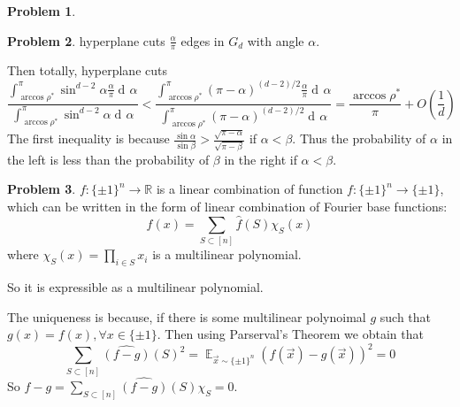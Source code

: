 \documentclass[a4paper]{article}
\theoremstyle{definition}
\newtheorem{problem}{Problem}
\theoremstyle{plain}
\newcommand{\Rbb}{\mathbb R}
\newcommand{\Ebb}{\mathop\mathbb E}
\newcommand{\dps}{\displaystyle}
\newcommand{\<}{\left<}
\renewcommand{\>}{\right>}
\numberwithin{equation}{problem}
\DeclareMathOperator{\dd}{d\!}
\newcommand{\ie}{ \textit{ i.e. } }
\begin{document}
\begin{problem}
  
  
\end{problem}
\begin{problem}
  hyperplane cuts  $ \frac{\alpha}{\pi} $ edges in  $ G_d $ with angle  $ \alpha $.
  
  Then totally, hyperplane cuts 
  \[\frac{\int_{\arccos\rho^*}^\pi \sin^{d-2}\alpha\frac{\alpha}{\pi}\dd \alpha}{\int_{\arccos\rho^*}^\pi\sin^{d-2}\alpha\dd \alpha}<\frac{\int_{\arccos\rho^*}^\pi(\pi-\alpha)^{(d-2)/2}\frac{\alpha}{\pi}\dd\alpha}{\int_{\arccos\rho^*}^\pi(\pi-\alpha)^{(d-2)/2}\dd \alpha}=\frac{\arccos\rho^*}{\pi}+O(\frac{1}{d})\]
  The first inequality is because  $ \dps\frac{\sin \alpha}{\sin \beta}>\frac{\sqrt{\pi-\alpha}}{\sqrt{\pi-\beta}} $ if  $ \alpha<\beta $. Thus the probability of  $ \alpha $ in the left is less than the probability of  $ \beta $ in the right if  $ \alpha<\beta $.

\end{problem}
\begin{problem}
  $ f:\{\pm 1\}^n\rightarrow \Rbb $ is a linear combination of function  $ f:\{\pm 1\}^n\rightarrow \{\pm 1\} $, which can be written in the form of linear combination of Fourier base functions:
  \[f(x)=\sum_{S\subset [n]}\hat{f}(S)\chi_S(x)\]
  where  $ \dps\chi_S(x)=\prod_{i\in S}x_i $ is a multilinear polynomial.
  
  So it is expressible as a multilinear polynomial.

  The uniqueness is because, if there is some multilinear polynoimal  $ g $ such that  $ g(x)=f(x),\forall x\in\{\pm 1\} $. Then using Parserval's Theorem we obtain that 
  \[\sum_{S\subset [n]}\hat{(f-g)}(S)^2=\Ebb_{\vec{x}\sim\{\pm 1\}^n}(f(\vec{x})-g(\vec{x}))^2=0\]
  So  $ f-g=\dps\sum_{S\subset [n]}\hat{(f-g)}(S)\chi_S=0 $.   
\end{problem}
\end{document}
